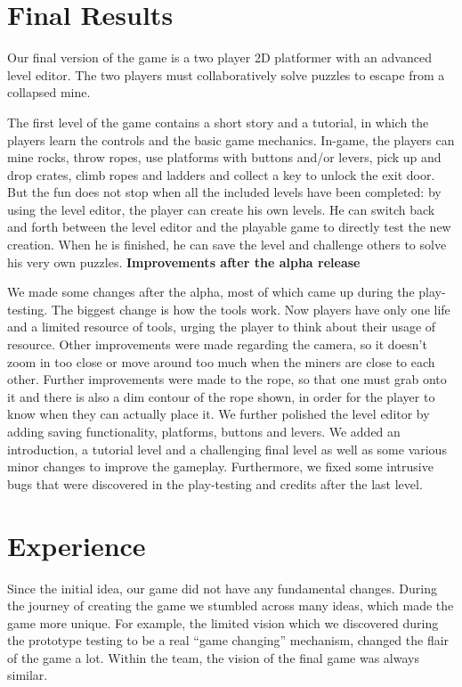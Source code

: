 \section{Final Results}
Our final version of the game is a two player 2D platformer with an advanced level editor. The two players must collaboratively solve puzzles to escape from a collapsed mine.

The first level of the game contains a short story and a tutorial, in which the players learn the controls and the basic game mechanics. In-game, the players can mine rocks, throw ropes, use platforms with buttons and/or levers, pick up and drop crates, climb ropes and ladders and collect a key to unlock the exit door.
But the fun does not stop when all the included levels have been completed: by using the level editor, the player can create his own levels. He can switch back and forth between the level editor and the playable game to directly test the new creation. When he is finished, he can save the level and challenge others to solve his very own puzzles.
\newline\newline
\textbf{Improvements after the alpha release}

We made some changes after the alpha, most of which came up during the play-testing. The biggest change is how the tools work. Now players have only one life and a limited resource of tools, urging the player to think about their usage of resource.
Other improvements were made regarding the camera, so it doesn't zoom in too close or move around too much when the miners are close to each other. Further improvements were made to the rope, so that one must grab onto it and there is also a dim contour of the rope shown, in order for the player to know when they can actually place it. We further polished the level editor by adding saving functionality, platforms, buttons and levers. We added an introduction, a tutorial level and a challenging final level as well as some various minor changes to improve the gameplay. Furthermore, we fixed some intrusive bugs that were discovered in the play-testing and credits after the last level.

\section{Experience}
Since the initial idea, our game did not have any fundamental changes. During the journey of creating the game we stumbled across many ideas, which made the game more unique. For example, the limited vision which we discovered during the prototype testing to be a real \enquote{game changing} mechanism, changed the flair of the game a lot. Within the team, the vision of the final game was always similar.

